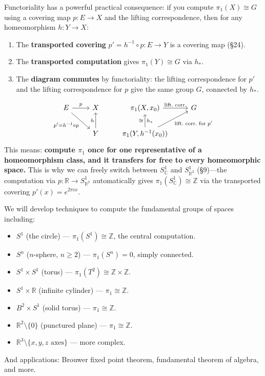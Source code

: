 \documentclass[11pt]{report}
\begin{document}
\begin{rembox}
Functoriality has a powerful practical consequence: if you compute $\pi_1(X) \cong G$ using a covering map $p: E \to X$ and the lifting correspondence, then for any homeomorphism $h: Y \to X$:
\begin{enumerate}[nosep]
    \item The \textbf{transported covering} $p' = h^{-1} \circ p: E \to Y$ is a covering map (\S 24).
    \item The \textbf{transported computation} gives $\pi_1(Y) \cong G$ via $h_*$.
    \item The \textbf{diagram commutes} by functoriality: the lifting correspondence for $p'$ and the lifting correspondence for $p$ give the same group $G$, connected by $h_*$.
\end{enumerate}
\[
\begin{tikzcd}
E \arrow[r, "p"] \arrow[dr, "p' = h^{-1} \circ p"'] & X & \pi_1(X, x_0) \arrow[r, "\text{lift.\ corr.}"] & G \\
& Y \arrow[u, "h"] & \pi_1(Y, h^{-1}(x_0)) \arrow[u, "h_*"', "\cong"] \arrow[ur, "\text{lift.\ corr.\ for } p'"'] &
\end{tikzcd}
\]
This means: \textbf{compute $\pi_1$ once for one representative of a homeomorphism class, and it transfers for free to every homeomorphic space.} This is why we can freely switch between $S^1_{\mathbb{C}}$ and $S^1_{\mathbb{R}^2}$ (\S 9)---the computation via $p: \mathbb{R} \to S^1_{\mathbb{R}^2}$ automatically gives $\pi_1(S^1_{\mathbb{C}}) \cong \mathbb{Z}$ via the transported covering $p'(x) = e^{2\pi i x}$.
\end{rembox}

\begin{rembox}
We will develop techniques to compute the fundamental groups of spaces including:
\begin{itemize}[nosep]
    \item $S^1$ (the circle) --- $\pi_1(S^1) \cong \mathbb{Z}$, the central computation.
    \item $S^n$ ($n$-sphere, $n \geq 2$) --- $\pi_1(S^n) = 0$, simply connected.
    \item $S^1 \times S^1$ (torus) --- $\pi_1(T^2) \cong \mathbb{Z} \times \mathbb{Z}$.
    \item $S^1 \times \mathbb{R}$ (infinite cylinder) --- $\pi_1 \cong \mathbb{Z}$.
    \item $B^2 \times S^1$ (solid torus) --- $\pi_1 \cong \mathbb{Z}$.
    \item $\mathbb{R}^2 \setminus \{0\}$ (punctured plane) --- $\pi_1 \cong \mathbb{Z}$.
    \item $\mathbb{R}^3 \setminus \{x, y, z \text{ axes}\}$ --- more complex.
\end{itemize}
And applications: Brouwer fixed point theorem, fundamental theorem of algebra, and more.
\end{rembox}
\end{document}
